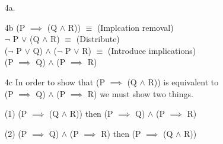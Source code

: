 \documentclass[11pt]{article}
\begin{document}
\begin{flushleft}
\begin{enumerate}[widest={5.2}]
(2) assume (P $\wedge$ R) is true. If (P $\wedge$ R) is true then it must be the case that P AND R are both true. Since P AND R are both true, since P AND R must be true, then (Q $\vee$ R) must be true since R is true. and the statement P $\wedge$ (Q $\vee$ R) must also be true since P is also true. Therefore, P $\wedge$ (Q $\vee$ R) and (P $\wedge$ Q) $\vee$ (P $\wedge$ R) must be equivalent.
 
\item[4a.] 
 \begin{center}
\end{center}
\medskip

\item[4b]
 (P $\implies$ (Q $\wedge$ R)) $\equiv$ (Implcation removal)\\$\neg$ P $\vee$ (Q $\wedge$ R) $\equiv$ (Distribute)\\ ($\neg$ P $\vee$ Q) $\wedge$ ($\neg$ P $\vee$ R) $\equiv$ (Introduce implications)\\ (P $\implies$ Q) $\wedge$ (P $\implies$ R)
 
 \item[4c]
In order to show that (P $\implies$ (Q $\wedge$ R)) is equivalent to\\ (P $\implies$ Q) $\wedge$ (P $\implies$ R) we must show two things.
\vspace{5mm} %

(1) (P $\implies$ (Q $\wedge$ R)) then (P $\implies$ Q) $\wedge$ (P $\implies$ R)

(2) (P $\implies$ Q) $\wedge$ (P $\implies$ R) then (P $\implies$ (Q $\wedge$ R))
\bigskip


\end{enumerate}
\end{flushleft}
\end{document}
